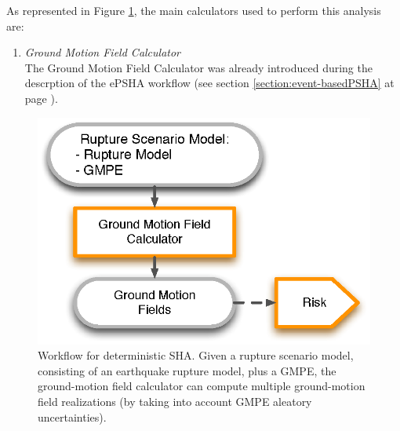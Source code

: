 As represented in Figure \ref{deterministic_workflow}, the main calculators 
used to perform this analysis are:
\begin{enumerate}
\item \emph{Ground Motion Field Calculator} \hfill \\
The Ground Motion Field Calculator was already 
introduced during the descrption of the ePSHA workflow (see section 
\ref{section:event-basedPSHA} at page \pageref{section:classicalPSHA}).
\end{enumerate}
\begin{figure}[!hb]
\centering
\includegraphics[width=12cm]{./Figures/Part_Hazard/deterministic_workflow.eps}
\caption{Workflow for deterministic SHA. Given a rupture scenario model, 
consisting of an earthquake rupture model, plus a GMPE, the ground-motion 
field calculator can compute multiple ground-motion field realizations (by 
taking into account GMPE aleatory uncertainties).}
\label{deterministic_workflow}
\end{figure}
%
%
%

